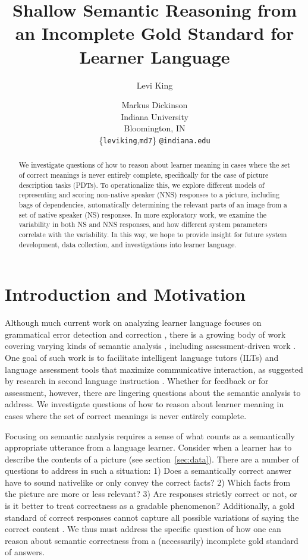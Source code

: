 \documentclass[11pt,letterpaper]{article}
\title{Shallow Semantic Reasoning from an Incomplete Gold Standard for
  Learner Language}
\author{Levi King \and Markus Dickinson \\
         Indiana University \\ Bloomington, IN \\ \{\texttt{leviking},\texttt{md7}\} \texttt{@indiana.edu}}
\date{}
\begin{document}
\maketitle

\begin{abstract}
  We investigate questions of how to reason about learner meaning in
  cases where the set of correct meanings is never entirely complete,
  specifically for the case of picture description tasks (PDTs).  To
  operationalize this, we explore different models of representing and
  scoring non-native speaker (NNS) responses to a picture, including
  bags of dependencies, automatically determining the relevant parts
  of an image from a set of native speaker (NS) responses.  In more
  exploratory work, we examine the variability in both NS and NNS
  responses, and how different system parameters correlate with the
  variability.  In this way, we hope to provide insight for future
  system development, data collection, and investigations into learner
  language.
\end{abstract}

\section{Introduction and Motivation}

Although much current work on analyzing learner language focuses on
grammatical error detection and correction
\citep[e.g.,][]{leacock:ea:14}, there is a growing body of work
covering varying kinds of semantic analysis
\citep[e.g.,][]{Meurers.Ziai.ea-11, bailey:meurers:08,
  king:dickinson:14, king:dickinson:13, petersen:10}, including
assessment-driven work \citep[e.g.,][]{somasundaran:ea:15,
  somasundaran:chodorow:14}.  One goal of such work is to facilitate
intelligent language tutors (ILTs) and language assessment tools that
maximize communicative interaction, as suggested by research in
second language instruction
\citep[cf.][]{CelceMurcia:1991:GrammarPedagogy,
  CelceMurcia:2002:GrammarThroughContext,
  LarsenFreeman:1991:TeachingGrammar}.  Whether for feedback or for
assessment, however, there are lingering questions about the semantic
analysis to address.
We investigate questions of how to reason about learner meaning 
in cases where the set of correct meanings is never entirely complete.

Focusing on semantic analysis requires a sense of what counts as a
semantically appropriate utterance from a language learner.  Consider
when a learner has to describe the contents of a picture (see
section~\ref{sec:data}).  There are a number of questions to address
in such a situation: 1) Does a semantically correct answer have to
sound nativelike or only convey the correct facts? 2) Which facts from
the picture are more or less relevant? 3) Are responses strictly
correct or not, or is it better to treat correctness as a gradable
phenomenon?  Additionally, a gold standard of correct responses cannot
capture all possible variations of saying the correct content
\citep[cf. paraphrases,][]{barzilay:03}.  We thus must address the
specific question of how one can reason about semantic correctness
from a (necessarily) incomplete gold standard of answers.
\end{document}
